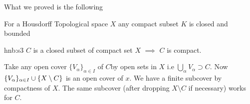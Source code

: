 What we proved is the following
\begin{Theorem}{}{}
	For a Housdorff Topological space $X$ any compact subset $K$ is closed and
	bounded
\end{Theorem}

\begin{Theorem}{}{hnb:s3}
	$C$ is a closed subset of compact set $X$ $\implies $ $C$ is compact.
\end{Theorem}
\begin{myproof}
	Take any open cover $\{V_{\alpha}\}_{\alpha\in I}$ of $C$by open sets in $X$
	i.e $\bigcup\limits_{\alpha}V_{\alpha}\supset C$. Now $\{V_{\alpha}\}_{\alpha\in I} \cup \{X\setminus C\}$ is an open cover of $x$. We have a finite
	subcover by compactness of $X$. The same subcover (after dropping $X\setminus
	C$ if necessary) works for $C$.
\end{myproof}

